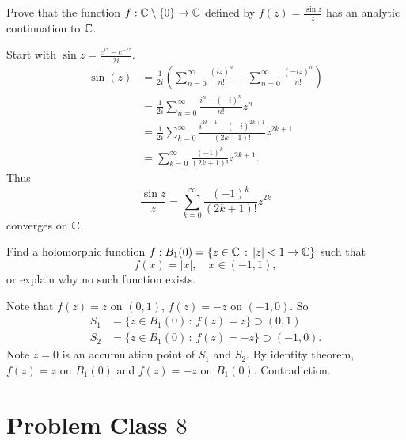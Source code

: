 \documentclass[10pt, a4paper]{article}
\begin{document}
\begin{problem}
    Prove that the function $f : \mathbb{C} \setminus \{0\} \to \mathbb{C}$ defined by $f(z) = \frac{\sin{z}}{z}$ has an analytic continuation to $\mathbb{C}$.

    \begin{solution}
        Start with $\sin{z} = \frac{e ^ {iz} - e ^ {-iz}}{2i}$.
        \begin{align*}
            \sin(z) &= \frac{1}{2i}\left(\sum_{n = 0}^{\infty}\frac{(iz) ^ n}{n!} - \sum_{n = 0}^{\infty}\frac{(-iz) ^ n}{n!}\right) \\
            &= \frac{1}{2i}\sum_{n = 0}^{\infty}\frac{i ^ n - (-i) ^ n}{n!}z ^ n \\
            &= \frac{1}{2i}\sum_{k = 0}^{\infty}\frac{i ^ {2k + 1} - (-i) ^ {2k + 1}}{(2k + 1)!}z ^ {2k + 1} \\
            &= \sum_{k = 0}^{\infty}\frac{(-1) ^ k}{(2k + 1)!}z ^ {2k + 1}.
        \end{align*}
        Thus
        \[
        \frac{\sin{z}}{z} = \sum_{k = 0}^{\infty}\frac{(-1) ^ k}{(2k + 1)!}z ^ {2k}
        \]
        converges on $\mathbb{C}$.
        
    \end{solution}
\end{problem}

\begin{problem}
    Find a holomorphic function $f : B_1(0) = \{z \in \mathbb{C}\,:\,|z| < 1 \to \mathbb{C}\}$ such that
    \[
    f(x) = |x|,\quad x \in (-1, 1),
    \]
    or explain why no such function exists.

    \begin{solution}
        Note that $f(z) = z$ on $(0, 1)$,
        $f(z) = -z$ on $(-1, 0)$.
        So
        \begin{align*}
            S_1 &= \{z \in B_1(0)\,:\, f(z) = z\} \supset (0, 1) \\
            S_2 &= \{z \in B_1(0)\,:\, f(z) = -z\} \supset (-1, 0).
        \end{align*}
        Note $z = 0$ is an accumulation point of $S_1$ and $S_2$.
        By identity theorem,
        $f(z) = z$ on $B_1(0)$ and $f(z) = -z$ on $B_1(0)$.
        Contradiction.
    \end{solution}
\end{problem}

\newpage

\section{Problem Class \texorpdfstring{$8$}{}}
\end{document}
